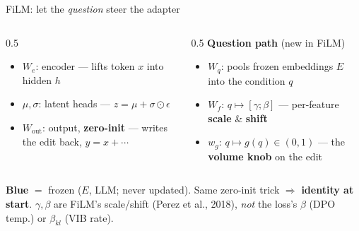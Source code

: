 \documentclass[aspectratio=169,11pt]{beamer}
\begin{document}
\begin{frame}{FiLM: let the \emph{question} steer the adapter}
\begin{columns}[T]
\begin{column}{0.5\textwidth}
\begin{itemize}\scriptsize\setlength\itemsep{1pt}
\item $W_e$: encoder --- lifts token $x$ into hidden $h$
\item $\mu,\sigma$: latent heads --- $z=\mu+\sigma\odot\epsilon$
\item $W_{\text{out}}$: output, \textbf{zero-init} --- writes the edit back, $y=x+\cdots$
\end{itemize}
\end{column}
\begin{column}{0.5\textwidth}
{\scriptsize \textcolor{trn}{\textbf{Question path}} {\normalfont(new in FiLM)}}
\begin{itemize}\scriptsize\setlength\itemsep{1pt}
\item $W_q$: pools frozen embeddings $E$ into the condition $q$
\item $W_{\!f}$: $q\mapsto[\gamma;\beta]$ --- per-feature \textbf{scale} \& \textbf{shift}
\item $w_g$: $q\mapsto g(q)\!\in\!(0,1)$ --- the \textbf{volume knob} on the edit
\end{itemize}
\end{column}
\end{columns}
\vspace{2pt}
{\scriptsize \textcolor{frz}{\textbf{Blue} $=$ frozen} ($E$, LLM; never updated). Same zero-init trick
$\Rightarrow$ \textbf{identity at start}. \textcolor{trn}{$\gamma,\beta$} are FiLM's scale/shift
(Perez et al., 2018), \emph{not} the loss's $\beta$ (DPO temp.) or $\beta_{kl}$ (VIB rate).}
\end{frame}
\end{document}
